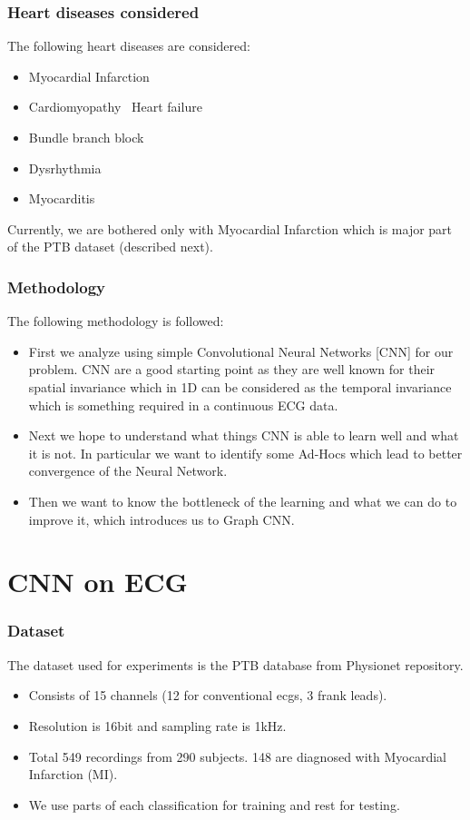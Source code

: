 \documentclass{beamer}
\begin{document}
\begin{frame}
  \frametitle{Heart diseases considered}
  The following heart diseases are considered:
  \begin{itemize}
  \item Myocardial Infarction
  \item Cardiomyopathy \ Heart failure
  \item Bundle branch block
  \item Dysrhythmia
  \item Myocarditis
  \end{itemize}
  Currently, we are bothered only with Myocardial Infarction which is major part of the PTB dataset (described next).
\end{frame}

\begin{frame}
  \frametitle{Methodology}
  The following methodology is followed:
  \begin{itemize}
  \item First we analyze using simple Convolutional Neural Networks [CNN] for our problem. CNN are a good starting point as they are well known for their spatial invariance which in 1D can be considered as the temporal invariance which is something required in a continuous ECG data.
  \item Next we hope to understand what things CNN is able to learn well and what it is not. In particular we want to identify some Ad-Hocs which lead to better convergence of the Neural Network.
  \item Then we want to know the bottleneck of the learning and what we can do to improve it, which introduces us to Graph CNN.
  \end{itemize}
\end{frame}

\section{CNN on ECG}
\begin{frame}
  \frametitle{Dataset}
  The dataset used for experiments is the PTB database from Physionet repository.
  \begin{itemize}
  \item Consists of 15 channels (12 for conventional ecgs, 3 frank leads).
  \item Resolution is 16bit and sampling rate is 1kHz.
  \item Total 549 recordings from 290 subjects. 148 are diagnosed with Myocardial Infarction (MI).
  \item We use parts of each classification for training and rest for testing.
  \end{itemize}
\end{frame}
\end{document}
